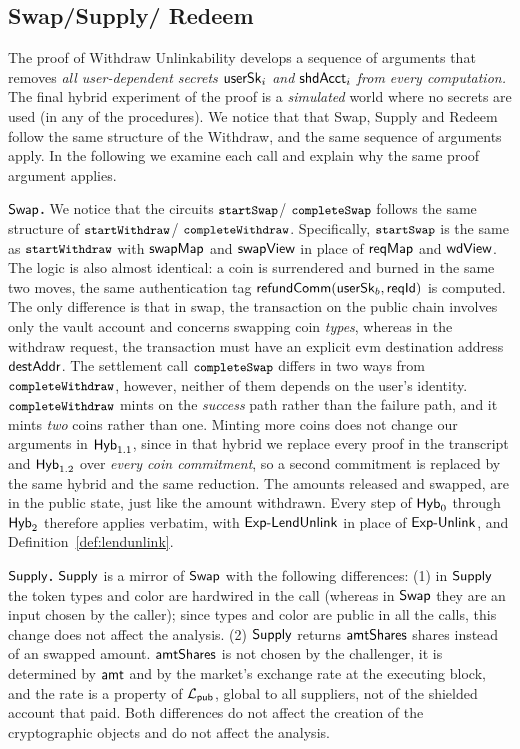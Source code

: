 \subsection{Swap/Supply/ Redeem}
\label{sub:swapsupplyredeemproof}


The proof of Withdraw Unlinkability develops a sequence of arguments
that removes  \emph{all user-dependent secrets $\mathsf{userSk}_i$ and $\mathsf{shdAcct}_i$ from every computation.}
The final hybrid experiment of the proof is a \emph{simulated} world where no secrets are used (in any of the procedures).
We notice that that Swap, Supply and Redeem follow the same structure of the Withdraw, and the same sequence of arguments apply.
In the following we examine each call and explain why the same proof argument applies.


\medskip
\noindent\textbf{$\mathsf{Swap}$.}  We notice that the circuits  $\texttt{\small startSwap}$/ $\texttt{\small completeSwap}$
 follows the same structure  of  $\texttt{\small startWithdraw}$/ $\texttt{\small completeWithdraw}$.
Specifically, $\texttt{\small startSwap}$ is the same as $\texttt{\small startWithdraw}$ with $\mathsf{swapMap}$ and
$\mathsf{swapView}$ in place of $\mathsf{reqMap}$ and $\mathsf{wdView}$. The logic is also
almost identical: a coin is surrendered and burned in the same two moves, the same authentication tag $\mathsf{refundComm}(\mathsf{userSk}_b, \mathsf{reqId})$  is computed.
The only difference is that in swap, the transaction on the public chain involves only the vault account and concerns swapping coin \emph{types}, whereas in the withdraw request, the transaction must have an explicit evm destination address $\mathsf{destAddr}$.
The settlement call   $\texttt{\small completeSwap}$
differs in two ways from $\texttt{\small completeWithdraw}$, however, neither of them depends on the user's identity.
$\texttt{\small completeWithdraw}$  mints on the \emph{success} path rather than the failure path, and it mints
\emph{two} coins rather than one.
Minting more coins does not change our arguments in  $\mathsf{Hyb}_{1.1}$, since in that hybrid we replace  every proof in the transcript and $\mathsf{Hyb}_{1.2}$ over \emph{every coin commitment}, so a second commitment is replaced by the same hybrid and the same reduction.
The amounts released and swapped, are in the public state, just like the amount withdrawn.
 Every step of $\mathsf{Hyb}_0$ through $\mathsf{Hyb}_2$ therefore applies verbatim, with
$\mathsf{Exp\text{-}LendUnlink}$ in place of $\mathsf{Exp\text{-}Unlink}$, and Definition~\ref{def:lendunlink}.

\medskip
\noindent\textbf{$\mathsf{Supply}$.}  $\mathsf{Supply}$ is a mirror of $\mathsf{Swap}$ with the following differences:
(1) in $\mathsf{Supply}$ the token types and color are hardwired in the call (whereas in $\mathsf{Swap}$ they are an input chosen by the caller);  since types and color are public in all the calls, this change does not affect the analysis.
(2) $\mathsf{Supply}$ returns $\mathsf{amtShares}$ shares instead of an swapped amount.
$\mathsf{amtShares}$ is not chosen by the challenger, it is determined by $\mathsf{amt}$ and by the market's exchange rate at the
executing block, and the rate is a property of $\mathcal{L}_{\mathsf{pub}}$, global to all suppliers, not of the shielded
account that paid.
Both differences do not affect the creation of the cryptographic objects and do not affect the analysis.

